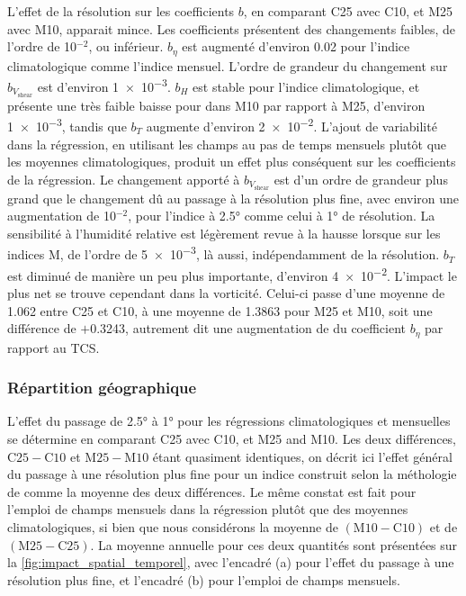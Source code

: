\documentclass[../main.tex]{subfiles}
\begin{document}
L'effet de la résolution sur les coefficients $b$, en comparant C25 avec C10, et M25 avec M10, apparait mince. Les coefficients présentent des changements
faibles, de l'ordre de \num{10}$^{\num{-2}}$, ou inférieur. $b_{\eta}$ est augmenté d'environ \num{0.02} pour l'indice climatologique comme l'indice mensuel.
L'ordre de grandeur du changement sur $b_{V_{\mathrm{shear}}}$ est d'environ \num{1e-3}. $b_H$ est stable pour l'indice climatologique, et présente une très
faible baisse pour dans M10 par rapport à M25, d'environ \num{1e-3}, tandis que $b_T$ augmente d'environ \num{2e-2}. L'ajout de variabilité dans la régression,
en utilisant les champs au pas de temps mensuels plutôt que les moyennes climatologiques, produit un effet plus conséquent sur les coefficients de la
régression. Le changement apporté à $b_{V_{\mathrm{shear}}}$ est d'un ordre de grandeur plus grand que le changement dû au passage à la résolution plus fine,
avec environ une augmentation de \num{10}$^{\num{-2}}$, pour l'indice à \ang{2.5} comme celui à \ang{1} de résolution. La sensibilité à l'humidité relative est
légèrement revue à la hausse lorsque sur les indices M, de l'ordre de \num{5e-3}, là aussi, indépendamment de la résolution. $b_T$ est diminué de manière un peu
plus importante, d'environ \num{4e-2}. L'impact le plus net se trouve cependant dans la vorticité. Celui-ci passe d'une moyenne de \num{1.062} entre C25 et C10,
à une moyenne de \num{1.3863} pour M25 et M10, soit une différence de $+$\num{0.3243}, autrement dit une augmentation de  du coefficient $b_{\eta}$
par rapport au TCS.

\subsubsection{Répartition géographique}\label{sec:repartition_geographique}

L'effet du passage de \ang{2.5} à \ang{1} pour les régressions climatologiques et mensuelles se détermine en comparant C25 avec C10, et M25 and M10. Les deux
différences, $\mathrm{C25} - \mathrm{C10}$ et $\mathrm{M25} - \mathrm{M10}$ étant quasiment identiques, on décrit ici l'effet général du passage à une
résolution plus fine pour un indice construit selon la méthologie de \textcite{tippett_poisson_2011} comme la moyenne des deux différences. Le même constat est
fait pour l'emploi de champs mensuels dans la régression plutôt que des moyennes climatologiques, si bien que nous considérons la moyenne de $(\mathrm{M10} -
\mathrm{C10})$ et de $(\mathrm{M25} - \mathrm{C25})$. La moyenne annuelle pour ces deux quantités sont présentées sur la \cref{fig:impact_spatial_temporel},
avec l'encadré (a) pour l'effet du passage à une résolution plus fine, et l'encadré (b) pour l'emploi de champs mensuels.
\end{document}
